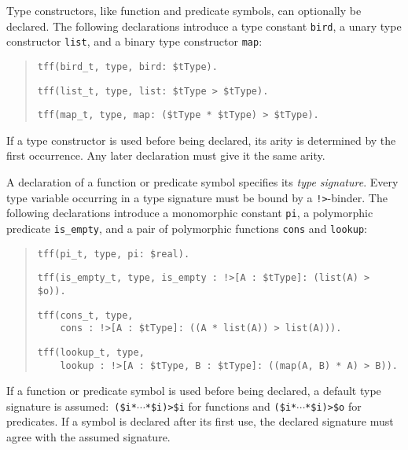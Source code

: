 
 Type constructors,
like function and predicate symbols,
can optionally be declared.
The following declarations introduce a type
constant {\tt bird}, a unary type constructor {\tt list},
and a binary type constructor {\tt map}:
\begin{quote}
\verb+tff(bird_t, type, bird: $tType).+
\par\smallskip
\verb+tff(list_t, type, list: $tType > $tType).+
\par\smallskip
\verb+tff(map_t, type, map: ($tType * $tType) > $tType).+
\end{quote}
If a type constructor is used before being declared, its arity is
determined by the first occurrence. Any later declaration
must give it the same arity.

A declaration of a function or predicate symbol specifies its
{\em type signature}.
Every type variable occurring in a type signature must be bound by a
{\tt !>}-binder.
The following declarations introduce a monomorphic
constant {\tt pi}, a polymorphic predicate
{\tt is\_empty}, and a pair of polymorphic functions {\tt cons} and {\tt lookup}:
\begin{quote}
\verb+tff(pi_t, type, pi: $real).+
\par\smallskip
\verb+tff(is_empty_t, type, is_empty : !>[A : $tType]: (list(A) > $o)).+\kern-10mm
\par\smallskip
\verb+tff(cons_t, type,+\\
\verb+    cons : !>[A : $tType]: ((A * list(A)) > list(A))).+
\par\smallskip
\verb+tff(lookup_t, type,+\\
\verb+    lookup : !>[A : $tType, B : $tType]: ((map(A, B) * A) > B)).+\kern-10mm
\end{quote}
If a function or predicate symbol is used before being declared, a
default type signature is assumed:\ {\tt (\$i\;*\;${\cdots}$\;*\;\$i)\;>\;\$i}
for functions and {\tt (\$i\;*\;${\cdots}$\;*\;\$i)\;>\;\$o} for predicates.
If a symbol is declared after its first use, the declared signature
must agree with the assumed signature.

